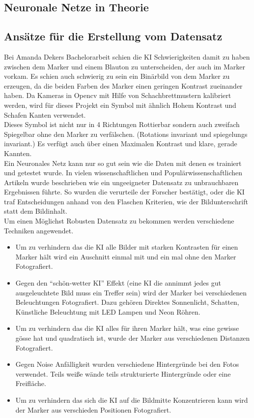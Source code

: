 \documentclass[conference]{IEEEtran}
\begin{document}
\subsection{Neuronale Netze in Theorie}	%

\subsection{Ansätze für die Erstellung vom Datensatz}	%

Bei Amanda Dekers Bachelorarbeit schien die KI Schwierigkeiten damit zu haben zwischen  dem Marker und einem Blauton zu unterscheiden, der auch im Marker vorkam. Es schien auch schwierig zu sein ein Binärbild von dem Marker zu erzeugen, da die beiden Farben des Marker einen geringen Kontrast zueinander haben. Da Kameras in Opencv mit Hilfe von Schachbrettmustern kalibriert werden, wird für dieses Projekt ein Symbol mit ähnlich Hohem Kontrast und Schafen Kanten verwendet.\\
 Dieses Symbol ist nicht nur in 4 Richtungen Rottierbar sondern auch zweifach Spiegelbar ohne den Marker zu verfälschen. (Rotations invariant und spiegelungs invariant.) Es verfügt auch über einen Maximalen Kontrast und klare, gerade Kannten. \\
 \noindent
Ein Neuronales Netz kann nur so gut sein wie die Daten mit denen es trainiert und getestet wurde. In vielen wissenschaftlichen und Populärwissenschaftlichen Artikeln wurde beschrieben wie ein ungeeigneter Datensatz zu unbrauchbaren Ergebnissen führte. So wurden die verurteile der Forscher bestätigt, oder die KI traf Entscheidungen anhand von den Flaschen Kriterien, wie der Bildunterschrift statt dem Bildinhalt. \\
Um einen Möglichst Robusten Datensatz zu bekommen  werden verschiedene Techniken angewendet.
\begin{itemize}
	\item Um zu verhindern das die KI alle Bilder mit starken Kontrasten für einen Marker hält wird ein Auschnitt einmal mit und ein mal ohne den Marker Fotografiert.
	\item Gegen den  "`schön-wetter KI"' Effekt (eine KI die annimmt jedes gut ausgeleuchtete Bild muss ein Treffer sein) wird der Marker bei verschiedenen Beleuchtungen Fotografiert. Dazu gehören Direktes Sonnenlicht, Schatten, Künstliche Beleuchtung mit LED Lampen und Neon Röhren. 
	\item Um zu verhindern das die KI alles für ihren Marker hält, was eine gewisse gösse hat und quadratisch ist, wurde der Marker aus verschiedenen Distanzen Fotografiert. 
	\item Gegen Noise Anfälligkeit wurden verschiedene Hintergründe bei den Fotos verwendet. Teils weiße wände teils strukturierte Hintergründe oder eine Freifläche. 
	\item Um zu verhindern das sich die KI auf die Bildmitte Konzentrieren kann wird der Marker aus verschieden Positionen Fotografiert. 
\end{itemize}
\end{document}

